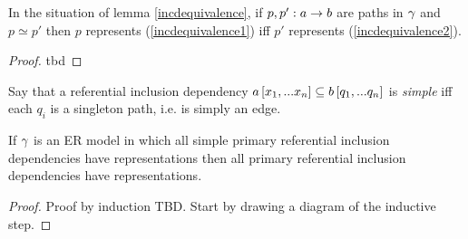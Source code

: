 \begin{lemma}
In the situation of lemma \ref{incdequivalence}, if $p,p':a \rightarrow b$
are paths in $\gamma$ and $p \simeq p'$ then $p$ represents (\ref{incdequivalence1})
iff $p'$ represents (\ref{incdequivalence2}). 
\end{lemma}
\begin{proof}
tbd
\end{proof}
\iffalse
\begin{categoricalaside}
If an ER schema is represented as a category with finite products (\textit{a la} Johnstone \textit{et al}) then
a referential inclusion dependency is a diagram
\begin{center}
$
\begin{array}{cp{0.75cm}c}
   \Rnode{a}{a}     & & \Rnode{x}{x}  \\[1.2cm]     
	                  & & \Rnode{b}{b}  
\end{array}
$
\ncarr{a}{x} 
\alabel{f}[0.33]
\ncarr{b}{x}
\blabel{m}[0.3]
\idcomp
\end{center}
\noindent
in \cat{C} such that in all instance functors $F$, 
$F(f)$ factors through $F(m)$.

Such a referential inclusion dependency is explicitly represented iff
 $f$ factors through $m$ i.e. there is an $f_0: a \morph b$ in \cat{C} such that 
$f_0 \circ m =f$. Note that because $m$ is monic then such an $f_0$ is the unique such morphism and if in some instance $F$,
$e: F(a) \morph F(b)$ is a function such that $e \circ F(m) = F(f)$ then $F(f_0)=e$. 
\end{categoricalaside}
\fi


\begin{definition}
Say that a referential inclusion dependency $a\left[x_1,...x_n\right]\subseteq b\left[q_1,...q_n\right]$ is \textit{simple}
iff each $q_i$ is a singleton path, i.e. is simply an edge. 
\end{definition}

\begin{lemma}
If  $\gamma$ is an ER model in which all simple primary referential inclusion dependencies
have representations then all primary referential inclusion dependencies have representations. 
\end{lemma}
\begin{proof}
Proof by induction TBD. Start by drawing a diagram of the inductive step.
\end{proof}


